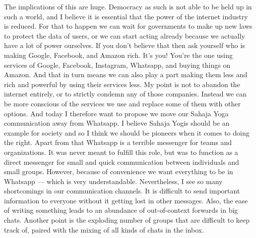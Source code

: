 \documentclass[12pt]{article}
\begin{document}
The implications of this are huge.
Democracy as such is not able to be held up in such a world, and I believe it is essential that the power of the internet industry is reduced.
For that to happen we can wait for governments to make up new laws to protect the data of users, or we can start acting already because we actually have a lot of power ourselves.
If you don't believe that then ask yourself who is making Google, Facebook, and Amazon rich.
It's you!
You're the one using services of Google, Facebook, Instagram, Whatsapp, and buying things on Amazon.
And that in turn means we can also play a part making them less and rich and powerful by using their services less.
My point is not to abandon the internet entirely, or to strictly condemn any of those companies.
Instead we can be more conscious of the services we use and replace some of them with other options.
And today I therefore want to propose we move our Sahaja Yoga communication away from Whatsapp.
I believe Sahaja Yogis should be an example for society and so I think we should be pioneers when it comes to doing the right.
Apart from that Whatsapp is a terrible messenger for teams and organizations.
It was never meant to fulfill this role, but was to function as a direct messenger for small and quick communication between individuals and small groups.
However, because of convenience we want everything to be in Whatsapp --- which is very understandable.
Nevertheless, I see so many shortcomings in our communication channels.
It is difficult to send important information to everyone without it getting lost in other messages.
Also, the ease of writing something leads to an abundance of out-of-context forwards in big chats.
Another point is the exploding number of groups that are difficult to keep track of, paired with the mixing of all kinds of chats in the inbox.
\end{document}
